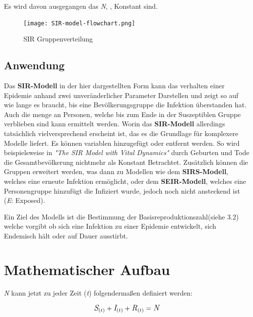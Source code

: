 \documentclass[12pt]{scrartcl} %
\begin{document}
Es wird davon ausgegangen das \textit{N}, \textbeta, \textgamma \space Konstant sind.

	\begin{figure}[h] %
	\centering
	\texttt{[image: SIR-model-flowchart.png]} 
	\caption{SIR Gruppenverteilung}
	\end{figure}


\subsection{Anwendung}

Das \textbf{SIR-Modell} in der hier dargestellten Form kann das verhalten einer Epidemie anhand zwei unveränderlicher Parameter Darstellen und zeigt so auf wie lange es braucht, bis eine Bevölkerungsgruppe die Infektion überstanden hat. Auch die menge an Personen, welche bis zum Ende in der Suszeptiblen Gruppe verblieben sind kann ermittelt werden. 
Worin das \textbf{SIR-Modell} allerdings tatsächlich vielversprechend erscheint ist, das es die Grundlage für komplexere Modelle liefert.
Es können variablen hinzugefügt oder entfernt werden. So wird beispielsweise in \textsl{"The SIR Model with Vital Dynamics"} \cite[s. 132]{5} durch Geburten und Tode die Gesamtbevölkerung nichtmehr als Konstant Betrachtet.
Zusätzlich können die Gruppen erweitert werden, was dann zu Modellen wie dem 
\textbf{SIRS-Modell}, welches eine erneute Infektion ermöglicht, oder dem \textbf{SEIR-Modell}, welches eine Personengruppe hinzufügt die Infiziert wurde, jedoch noch nicht ansteckend ist (\textit{E}: Exposed).

Ein Ziel des Modells ist die Bestimmung der Basisreproduktionszahl(siehe 3.2) welche vorgibt ob sich eine Infektion zu einer Epidemie entwickelt, sich Endemisch hält oder auf Dauer ausstirbt. \cite[vgl.]{2}

\newpage
\section{Mathematischer Aufbau}

\textit{N} kann jetzt zu jeder Zeit (\textit{t}) folgendermaßen definiert werden: \cite{3}


$$ \large\textit{S}_{(t)} + \textit{I}_{(t)} + \textit{R}_{(t)} = \textit{N}\normalsize $$
\end{document}
